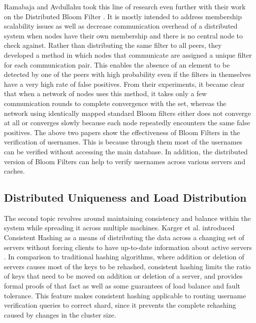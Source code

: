 \documentclass[conference]{IEEEtran}
\begin{document}
Ramabaja and Avdullahu took this line of research even further with their work on the Distributed Bloom Filter \cite{b2}. It is mostly intended to address membership scalability issues as well as decrease communication overhead of a distributed system when nodes have their own membership and there is no central node to check against. Rather than distributing the same filter to all peers, they developed a method in which nodes that communicate are assigned a unique filter for each communication pair. This enables the absence of an element to be detected by one of the peers with high probability even if the filters in themselves have a very high rate of false positives. From their experiments, it became clear that when a network of nodes uses this method, it takes only a few communication rounds to complete convergence with the set, whereas the network using identically mapped standard Bloom filters either does not converge at all or converges slowly because each node repeatedly encounters the same false positives. The above two papers show the effectiveness of Bloom Filters in the verification of usernames. This is because through them most of the usernames can be verified without accessing the main database. In addition, the distributed version of Bloom Filters can help to verify usernames across various servers and caches.

\subsection{Distributed Uniqueness and Load Distribution}
The second topic revolves around maintaining consistency and
balance within the system while spreading it across multiple machines. Karger et al. introduced Consistent Hashing as a means of distributing the data across a changing set of servers without forcing clients to have up-to-date information about active servers \cite{b3}. In comparison to traditional hashing algorithms, where addition or deletion of servers causes most of the keys to be rehashed, consistent hashing limits the ratio of keys that need to be moved on addition or deletion of a server, and provides formal proofs of that fact as well as some guarantees of load balance and fault tolerance. This feature makes consistent hashing applicable to routing username verification queries to correct shard, since it prevents the complete rehashing caused by changes in the cluster size.
\end{document}
